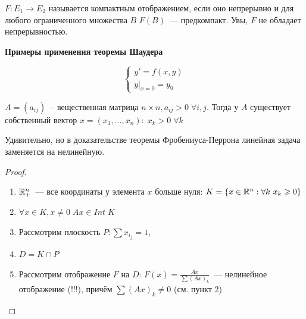 \begin{definition}
$F: E_1 \to E_2$ называется компактным отображением, если  оно непрерывно и для любого ограниченного множества $B$ $F(B)$~--- предкомпакт. Увы, $F$ не обладает непрерывностью.
\end{definition}

\textbf{Примеры применения теоремы Шаудера}

\[
\begin{cases}
y' = f(x,y)\\
y|_{x=0}=y_0
\end{cases}
\]

\begin{theorem}
    $A=(a_{ij})$~-- вещественная матрица $n \times n, a_{ij} > 0 \; \forall i, j$. Тогда у $A$ существует собственный вектор $x=(x_1, \ldots, x_n): \; x_k>0 \; \forall k$
\end{theorem}

Удивительно, но в доказательстве теоремы Фробениуса-Перрона линейная задача заменяется на нелинейную.

\begin{proof}
\begin{enumerate}
    \item $\mathbb{R}^n_+$~--- все координаты у элемента $x$ больше нуля: $K = \{x \in \R^n : \forall k\ x_k \geqslant 0\}$
    \item \begin{statement}
        $\forall x \in K, x \neq 0 \; Ax \in Int \; K$
    \end{statement}
    \item Рассмотрим плоскость $P: \sum x_{i_j} = 1$,
    \item $D = K \cap P$
    \item Рассмотрим отображение $F$ на $D$: $F(x)=\frac{Ax}{\sum (Ax)_k}$~--- нелинейное отображение (!!!), причём $\sum (Ax)_k \neq 0$ (см. пункт 2)
\end{enumerate}
\end{proof}